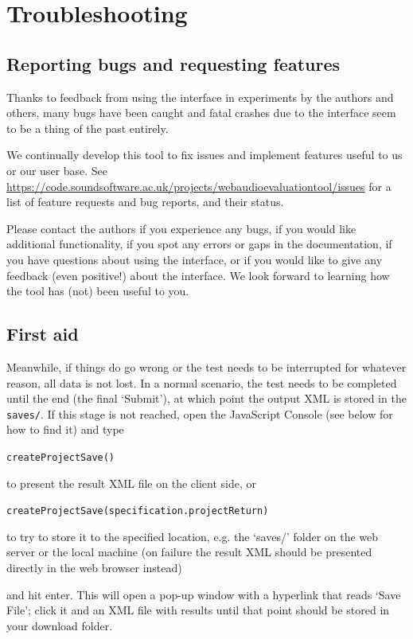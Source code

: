 \documentclass[11pt, oneside]{article}   	%
\begin{document}
\clearpage
\section{Troubleshooting} \label{sec:troubleshooting}
	\subsection{Reporting bugs and requesting features}
	Thanks to feedback from using the interface in experiments by the authors and others, many bugs have been caught and fatal crashes due to the interface seem to be a thing of the past entirely. 

	We continually develop this tool to fix issues and implement features useful to us or our user base. See \url{https://code.soundsoftware.ac.uk/projects/webaudioevaluationtool/issues} for a list of feature requests and bug reports, and their status. 

	Please contact the authors if you experience any bugs, if you would like additional functionality, if you spot any errors or gaps in the documentation, if you have questions about using the interface, or if you would like to give any feedback (even positive!) about the interface. We look forward to learning how the tool has (not) been useful to you. 


	\subsection{First aid}
		Meanwhile, if things do go wrong or the test needs to be interrupted for whatever reason, all data is not lost. In a normal scenario, the test needs to be completed until the end (the final `Submit'), at which point the output XML is stored in the \texttt{saves/}. If this stage is not reached, open the JavaScript Console (see below for how to find it) and type 

		\texttt{createProjectSave()}

		to present the result XML file on the client side, or

		\texttt{createProjectSave(specification.projectReturn)}

		to try to store it to the specified location, e.g. the `saves/' folder on the web server or the local machine (on failure the result XML should be presented directly in the web browser instead)

		and hit enter. This will open a pop-up window with a hyperlink that reads `Save File'; click it and an XML file with results until that point should be stored in your download folder. 
		
\end{document}
